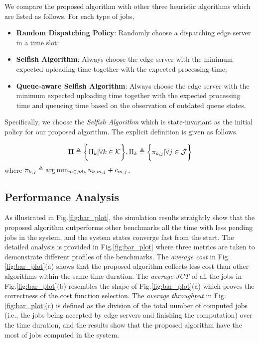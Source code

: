 We compare the proposed algorithm with other three heuristic algorithms which are listed as follows. For each type of jobs,
\begin{itemize}
    \item \textbf{Random Dispatching Policy}:
            Randomly choose a dispatching edge server in a time slot; 
    \item \textbf{Selfish Algorithm}:
            Always choose the edge server with the minimum expected uploading time together with the expected processing time;
    \item \textbf{Queue-aware Selfish Algorithm}:
            Always choose the edge server with the minimum expected uploading time together with the expected processing time and queueing time based on the observation of outdated queue states.
\end{itemize}
Specifically, we choose the \emph{Selfish Algorithm} which is state-invariant as the initial policy for our proposed algorithm.
The explicit definition is given as follows.
\begin{policy}
    \begin{align}
        \boldsymbol{\Pi} \triangleq \bigg\{ \Pi_{k} |\forall k\in\mathcal{K} \bigg\}, \Pi_{k} \triangleq \bigg\{{\pi_{k,j}|\forall j\in\mathcal{J}}\bigg\}
    \end{align}
    where $\pi_{k,j} \triangleq \arg\min_{m\in\mathcal{M}_{k}} u_{k,m,j} + c_{m,j}$.
\end{policy}

\subsection{Performance Analysis}
\label{subsec:basic}
As illustrated in Fig.\ref{fig:bar_plot}, the simulation results straightly show that the proposed 
algorithm outperforms other benchmarks all the time with less pending jobs in the system, and the system states converge fast from the start.
The detailed analysis is provided in Fig.\ref{fig:bar_plot} where three metrics are taken to demonstrate different profiles of the benchmarks.
The \emph{average cost} in Fig.\ref{fig:bar_plot}(a) shows that the proposed algorithm collects less cost than other algorithms within the same time duration.
The \emph{average JCT} of all the jobs in Fig.\ref{fig:bar_plot}(b) resembles the shape of Fig.\ref{fig:bar_plot}(a) which proves the correctness of the cost function selection.
The \emph{average throughput} in Fig.\ref{fig:bar_plot}(c) is defined as the division of the total number of computed jobs  (i.e., the jobs being accepted by edge servers and finishing the computation) over the time duration, and the results show that the proposed algorithm have the most of jobs computed in the system.

